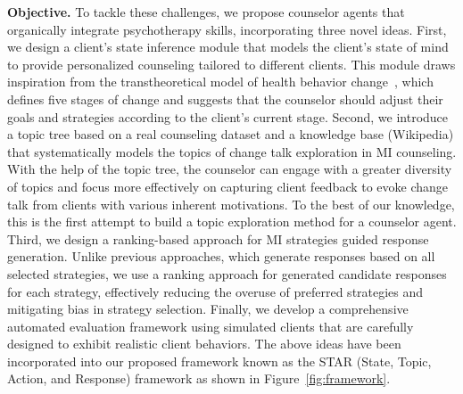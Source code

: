{\bf Objective.} To tackle these challenges, we propose counselor agents that organically integrate psychotherapy skills, incorporating three novel ideas. First, we design a client’s state inference module that models the client's state of mind to provide personalized counseling tailored to different clients. This module draws inspiration from the transtheoretical model of health behavior change~\citep{prochaska2005transtheoretical,prochaska2008initial}, which defines five stages of change and suggests that the counselor should adjust their goals and strategies according to the client’s current stage. Second, we introduce a topic tree based on a real counseling dataset and a knowledge base (Wikipedia) that systematically models the topics of change talk exploration in MI counseling. With the help of the topic tree, the counselor can engage with a greater diversity of topics and focus more effectively on capturing client feedback to evoke change talk from clients with various inherent motivations. To the best of our knowledge, this is the first attempt to build a topic exploration method for a counselor agent. Third, we design a ranking-based approach for MI strategies guided response generation. Unlike previous approaches, which generate responses based on all selected strategies, we use a ranking approach for generated candidate responses for each strategy, effectively reducing the overuse of preferred strategies and mitigating bias in strategy selection. Finally, we develop a comprehensive automated evaluation framework using simulated clients that are carefully designed to exhibit realistic client behaviors.  The above ideas have been incorporated into our proposed framework known as the STAR (State, Topic, Action, and Response) framework as shown in Figure~\ref{fig:framework}. 

